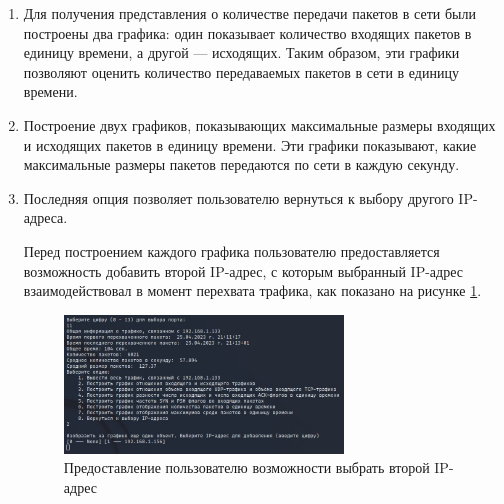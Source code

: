 \documentclass[bachelor, och, coursework]{SCWorks}
\begin{document}
\begin{enumerate}
\begin{enumerate}
    Частота PSH-флагов вычисляется по формуле 
    
    \begin{center}
      $r_{psh} = \frac{V_{P_{in}}}{V_{tcp}}$,
    \end{center}
    
    где $V_{P_{in}}$ число входящих TCP-пакетов, в которых установлен флаг PSH = 1, $V_{tcp}$ --- число входящих TCP-пакетов в единицу времени.
    Флаг PSH (Push) в TCP-заголовке используется для указания конечной точке передачи данных о том, что все буферизованные данные должны быть 
    немедленно отправлены получателю, а не ждать буферизации следующих данных. Когда отправитель устанавливает флаг PSH в заголовке TCP-сегмента, 
    он указывает получателю, что данные в этом сегменте должны быть переданы верхнему уровню протокола немедленно, без буферизации на приемной стороне.
    Таким образом, если значение величины $r_{psh}$ резко возросло в некоторый промежуток времени, значит за это время
    одно устройcтво успело передать другому устройству большое количество пакетов.

    \item Для получения представления о количестве передачи пакетов в сети были построены два графика: один показывает количество входящих пакетов 
    в единицу времени, а другой --- исходящих. Таким образом, эти графики позволяют оценить количество передаваемых пакетов в сети в единицу времени.
    \item Построение двух графиков, показывающих максимальные размеры входящих и исходящих пакетов в единицу времени. Эти графики показывают, какие 
    максимальные размеры пакетов передаются по сети в каждую секунду.
    \item Последняя опция позволяет пользователю вернуться к выбору другого IP-адреса.

    Перед построением каждого графика пользователю предоставляется возможность добавить второй IP-адрес, с которым выбранный IP-адрес взаимодействовал 
    в момент перехвата трафика, как показано на рисунке \ref{cmd-2ndip}.

    \begin{figure}[H]
      \centering
      \includegraphics[width=0.7\textwidth]{photo/cmd-2ndip.jpg}
      \caption{Предоставление пользователю возможности выбрать второй IP-адрес}
      \label{cmd-2ndip}
    \end{figure}


\end{enumerate}
\end{enumerate}
\end{document}
